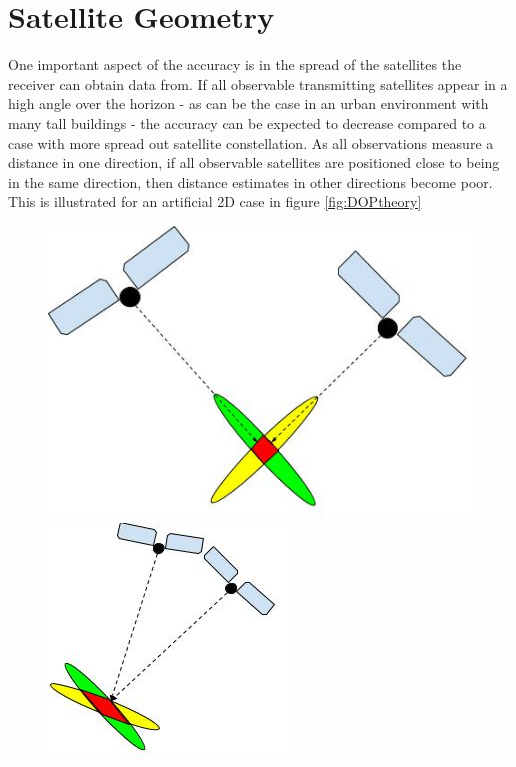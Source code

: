 \section{Satellite Geometry}\label{satelliteGeometry}
One important aspect of the accuracy is in the spread of the satellites the receiver can obtain data from. If all observable transmitting satellites appear in a high angle over the horizon - as can be the case in an urban environment with many tall buildings - the accuracy can be expected to decrease compared to a case with more spread out satellite constellation. As all observations measure a distance in one direction, if all observable satellites are positioned close to being in the same direction, then distance estimates in other directions become poor. This is illustrated for an artificial 2D case in figure \ref{fig:DOPtheory}
\begin{figure}
\begin{minipage}[t]{0.5\textwidth}
\includegraphics[width=\textwidth]{Background/LowDOP}
\end{minipage}
\begin{minipage}[t]{0.38\textwidth}
\includegraphics[width=\textwidth]{Background/HighDOP}

\end{minipage}
\end{figure}

